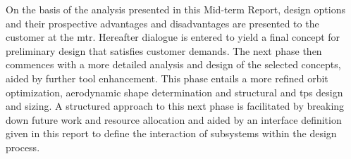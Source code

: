 \newline
\newline
On the basis of the analysis presented in this Mid-term Report, design options and their prospective advantages and disadvantages are presented to the customer at the \gls{mtr}. Hereafter dialogue is entered to yield a final concept for preliminary design that satisfies customer demands. The next phase then commences with a more detailed analysis and design of the selected concepts, aided by further tool enhancement. This phase entails a more refined orbit optimization, aerodynamic shape determination and structural and \gls{tps} design and sizing. A structured approach to this next phase is facilitated by breaking down future work and resource allocation and aided by an interface definition given in this report to define the interaction of subsystems within the design process.